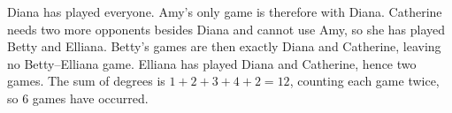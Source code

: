 Diana has played everyone. Amy's only game is therefore with Diana. Catherine needs two more opponents besides Diana and cannot use Amy, so she has played Betty and Elliana. Betty's games are then exactly Diana and Catherine, leaving no Betty--Elliana game. Elliana has played Diana and Catherine, hence two games. The sum of degrees is $1+2+3+4+2=12$, counting each game twice, so $\boxed6$ games have occurred.
